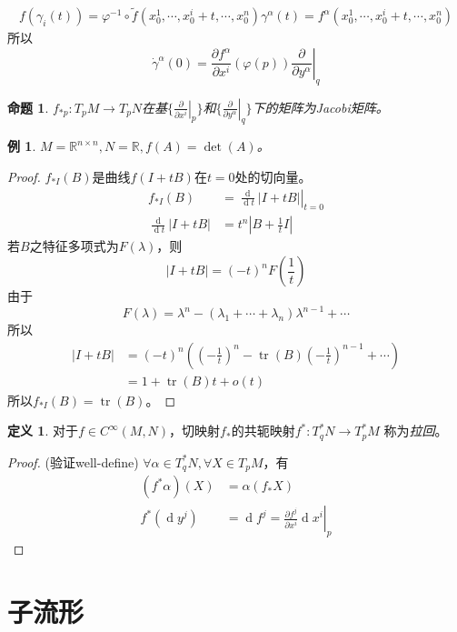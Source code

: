 \documentclass[winfonts,UTF8,c5size,a4paper,fancyhdr,hyperref,titlepage,nocap]{ctexart}
\newtheorem{prop}[thm]{命题}
\newtheorem{exa}[thm]{例}
\theoremstyle{definition}
\newtheorem{defn}[thm]{定义}
\theoremstyle{remark}
\numberwithin{equation}{subsection}
\newcommand{\Real}{\mathbb{R}}
\newcommand{\red}{\color{red}}
\newcommand{\dd}{\operatorname{d}}
\newcommand{\dt}{\frac{\operatorname{d}}{\operatorname{d}t}}
\newcommand{\pfrac}[2]{\frac{\partial{#1}}{\partial{#2}}}
\newcommand{\px}[1]{\left.\pfrac{}{x^{#1}}\right|_p}
\newcommand{\py}[1]{\left.\pfrac{}{y^{#1}}\right|_q}
\newcommand{\tr}{\operatorname{tr}}
\newcommand{\local}[2]{\left.{#1}\right|_{#2}}%
\newcommand{\localt}[1]{\local{#1}{t=0}}%
\newcommand{\localp}[1]{\local{#1}{p}}%
\begin{document}
\begin{gather*}
f(\gamma_i(t))=\varphi^{-1}\circ\widetilde{f}(x_0^1,\cdots,x_0^i+t,\cdots,x_0^n)
\gamma^{\alpha}(t)=f^{\alpha}(x_0^1,\cdots,x_0^i+t,\cdots,x_0^n)
\end{gather*}
所以
\begin{equation*}
\dot{\gamma}^{\alpha}(0)=\left.\pfrac{f^{\alpha}}{x^i}(\varphi(p))\pfrac{}{y^{\alpha}}\right|_q
\end{equation*}
\begin{prop}
  $f_{\ast p}\colon T_pM\to T_pN$在基$\{\px{i}\}$和$\{\py{\alpha}\}$下的矩阵为Jacobi矩阵。
\end{prop}
\begin{exa}
  $M=\Real^{n\times n}, N=\Real, f(A)=\det(A)$。
\end{exa}
\begin{proof}
$f_{\ast I}(B)$是曲线$f(I+tB)$在$t=0$处的切向量。
\begin{align*}
f_{\ast I}(B)&=\localt{\dt|I+tB|}\\
\dt|I+tB|&=t^n|B+\frac{1}{t}I|
\end{align*}
若$B$之特征多项式为$F(\lambda)$，则
\begin{equation*}
|I+tB|=(-t)^nF(\frac{1}{t})
\end{equation*}
由于
\begin{equation*}
F(\lambda)=\lambda^n-(\lambda_1+\cdots+\lambda_n)\lambda^{n-1}+\cdots
\end{equation*}
所以
\begin{align*}
|I+tB|&=(-t)^{n}((-\frac{1}{t})^n-\tr(B)(-\frac{1}{t})^{n-1}+\cdots)\\
      &=1+\tr(B) t+o(t)
\end{align*}
所以$f_{\ast I}(B)=\tr(B)$。
\end{proof}
\begin{defn}
对于$f\in C^{\infty}(M,N)$，切映射$f_{\ast}$的共轭映射$f^{\ast}\colon T^{\ast}_qN\to T^{\ast}_pM$ 称为\emph{\red 拉回}。
\end{defn}
\begin{proof}(验证well-define)
$\forall\alpha\in T^{\ast}_qN,\forall X\in T_pM$，有
\begin{align*}
(f^{\ast}\alpha)(X)&=\alpha(f_{\ast}X)\\
f^{\ast}(\dd y^j)&=\dd f^j=\localp{\pfrac{f^j}{x^i}\dd x^i}
\end{align*}
\end{proof}

\section{子流形}
\end{document}
